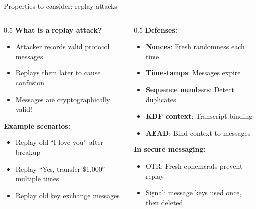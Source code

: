 \ifdefined\PRESENTATION\else\PassOptionsToClass{handout}{beamer}\fi\documentclass[aspectratio=169, lualatex]{beamer}
\begin{document}
\begin{frame}{Properties to consider: replay attacks}
	\begin{columns}
		\begin{column}{0.5\textwidth}
			\textbf{What is a replay attack?}
			\begin{itemize}
				\item Attacker records valid protocol messages
				\item Replays them later to cause confusion
				\item Messages are cryptographically valid!
			\end{itemize}
			\textbf{Example scenarios:}
			\begin{itemize}
				\item Replay old ``I love you'' after breakup
				\item Replay ``Yes, transfer \$1{,}000'' multiple times
				\item Replay old key exchange messages
			\end{itemize}
		\end{column}
		\begin{column}{0.5\textwidth}
			\textbf{Defenses:}
			\begin{itemize}
				\item \textbf{Nonces}: Fresh randomness each time
				\item \textbf{Timestamps}: Messages expire
				\item \textbf{Sequence numbers}: Detect duplicates
				\item \textbf{KDF context}: Transcript binding
				\item \textbf{AEAD}: Bind context to messages
			\end{itemize}
			\textbf{In secure messaging:}
			\begin{itemize}
				\item OTR: Fresh ephemerals prevent replay
				\item Signal: message keys used once, then deleted
			\end{itemize}
		\end{column}
	\end{columns}
\end{frame}
\end{document}
